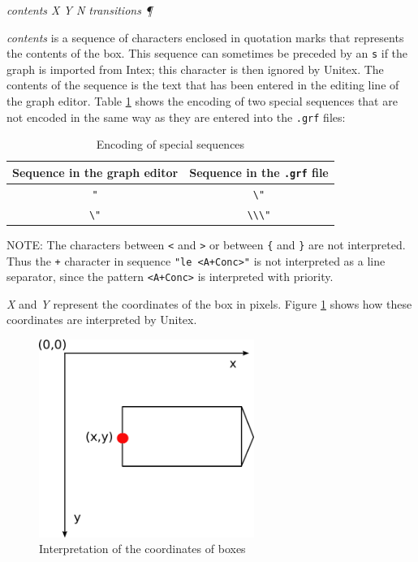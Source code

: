 \bigskip
\textit{contents X Y N transitions \P}

\bigskip
\noindent \textit{contents} is a sequence of characters enclosed in quotation
marks that represents the contents of the box. This sequence can sometimes be
preceded by an \verb+s+ if the graph is imported from Intex; this character is
then ignored by Unitex. The contents of the sequence is the text that has been
entered in the editing line of the graph editor. Table \ref{table10-2} shows the
encoding of two special sequences that are not encoded in the same way as they
are entered into the \verb+.grf+ files:

\bigskip
\begin{table}[h]
\begin{center}
\begin{tabular}{|c|c|}
\hline
Sequence in the graph editor & Sequence in the \verb+.grf+ file
\\
\hline
\verb$"$ & \verb$\"$
\\
\hline
\verb$\"$ & \verb$\\\"$
\\
\hline
\end{tabular}
\caption{Encoding of special sequences\label{table10-2}}
\end{center}
\end{table}

\bigskip
\noindent NOTE: The characters between \verb+<+ and \verb+>+ or between \verb+{+
and \verb+}+ are not interpreted. Thus the \verb$+$ character in sequence
\verb$"le <A+Conc>"$ is not interpreted as a line separator, since the pattern
\verb$<A+Conc>$ is interpreted with priority.

\bigskip
\noindent \textit{X} and \textit{Y} represent the coordinates of the box in
pixels. Figure
\ref{fig-box-coordinates} shows how these coordinates are interpreted by Unitex.

\begin{figure}[!h]
\begin{center}
\includegraphics[width=7cm]{resources/img/repere.png}
\caption{Interpretation of the coordinates of boxes\label{fig-box-coordinates}}
\end{center}
\end{figure}

